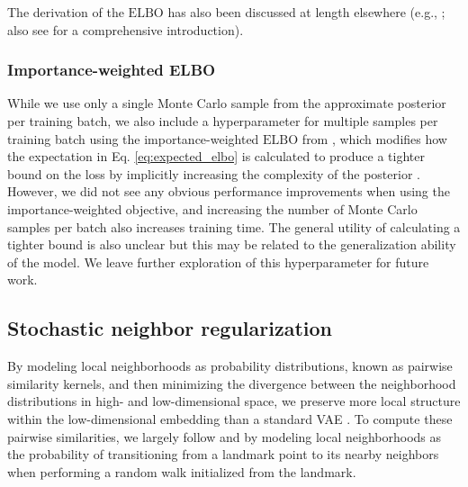 \documentclass[11pt,a4paper,oneside]{book}
\begin{document}
\begin{appendices}
The derivation of the $\mathrm{ELBO}$ has also been discussed at length elsewhere (e.g., \citealt{kingma2013vae, kingma2014semi, burda2015iwae, alemi2016deep, dilokthanakul2016gmvae, alemi2017fixing, ding2018scvis}; also see \citealt{kingma2019introduction} for a comprehensive introduction).


\subsubsection{Importance-weighted ELBO}
\label{appendix:iwae}
While we use only a single Monte Carlo sample from the approximate posterior per training batch, we also include a hyperparameter for multiple samples per training batch using the importance-weighted $\mathrm{ELBO}$ from \cite{burda2015iwae}, which modifies how the expectation in Eq. \ref{eq:expected_elbo} is calculated to produce a tighter bound on the loss by implicitly increasing the complexity of the posterior \citep{cremer2017reinterpreting}. However, we did not see any obvious performance improvements when using the importance-weighted objective, and increasing the number of Monte Carlo samples per batch also increases training time. The general utility of calculating a tighter bound is also unclear \citep{rainforth2018tighter} but this may be related to the generalization ability of the model. We leave further exploration of this hyperparameter for future work.

\subsection{Stochastic neighbor regularization}
\label{appendix:sne}
By modeling local neighborhoods as probability distributions, known as pairwise similarity kernels, and then minimizing the divergence between the neighborhood distributions in high- and low-dimensional space, we preserve more local structure within the low-dimensional embedding than a standard VAE \citep{ding2018scvis}. To compute these pairwise similarities, we largely follow \cite{hinton2003stochastic} and \cite{maaten2008tsne} by modeling local neighborhoods as the probability of transitioning from a landmark point to its nearby neighbors when performing a random walk initialized from the landmark. 


\end{appendices}
\end{document}
